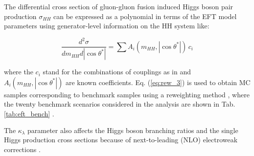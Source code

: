 The differential cross section of gluon-gluon fusion
induced Higgs boson pair production $\sigma_{HH}$ can be expressed as a polynomial in terms of the
EFT model parameters using generator-level information on the HH system like:

\begin{equation}
\label{eq:rew_3}
  \frac{d^2\sigma}{d m_{HH}d|\cos{\theta^*}| } = \sum A_i( m_{HH}, |\cos{\theta^*}| ) \, c_i
\end{equation}

where the $c_i$ stand for the combinations of couplings as in \cite{Buchalla:2018yce} and $A_i( m_{HH}, |\cos{\theta^*}| )$ are known coefficients.
Eq. (\ref{eq:rew_3}) is used to obtain MC samples corresponding to benchmark samples using a reweighting method \cite{Carvalho:2016rys,Buchalla:2018yce},
where the twenty benchmark scenarios considered in the analysis are shown in Tab. \ref{tab:eft_bench} \cite{Carvalho:2015ttv,Buchalla:2018yce,Capozi:2019xsi}. 

The $\kappa_{\lambda}$ parameter also affects the Higgs boson branching ratios and the single Higgs production cross sections because of next-to-leading (NLO) electroweak corrections \cite{Degrassi:2016wml,Maltoni:2017ims}.

